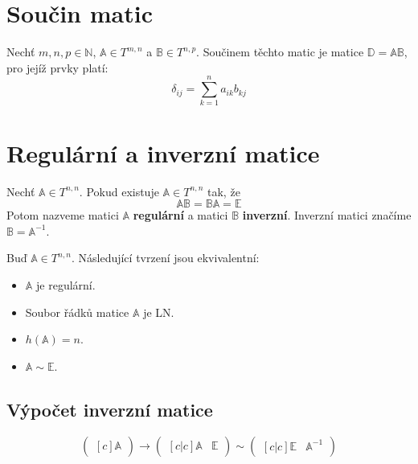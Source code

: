 \documentclass{szzclass}
\begin{document}
\section{Součin matic}
Nechť $m,n,p\in \mathbb{N}$, $\mathbb{A}\in T^{m,n}$ a $\mathbb{B}\in T^{n,p}$. Součinem těchto matic je matice $\mathbb{D}=\mathbb{A}\mathbb{B}$, pro jejíž prvky platí:
$$
\delta_{ij}=\sum_{k=1}^{n}{a_{ik} b_{kj}}
$$

\section{Regulární a inverzní matice}
\begin{definition}
Nechť $\mathbb{A}\in T^{n,n}$. Pokud existuje $\mathbb{A}\in T^{n,n}$ tak, že 
$$
\mathbb{A}\mathbb{B}=\mathbb{B}\mathbb{A}=\mathbb{E}
$$
Potom nazveme matici $\mathbb{A}$ \textbf{regulární} a matici $\mathbb{B}$ \textbf{inverzní}. Inverzní matici značíme $\mathbb{B}=\mathbb{A}^{-1}$.
\end{definition}

\begin{theorem}
Buď $\mathbb{A}\in T^{n,n}$. Následující tvrzení jsou ekvivalentní:
\begin{itemize}
\item $\mathbb{A}$ je regulární.
\item Soubor řádků matice $\mathbb{A}$ je LN.
\item $h(\mathbb{A}) = n$.
\item $\mathbb{A} \sim \mathbb{E}$.
\end{itemize}
\end{theorem}

\subsection{Výpočet inverzní matice}
\textit{}
\begin{equation}
\begin{pmatrix}[c]
\mathbb{A}
\end{pmatrix} \rightarrow
\begin{pmatrix}[c|c]
\mathbb{A} & \mathbb{E}
\end{pmatrix} \sim
\begin{pmatrix}[c|c]
\mathbb{E} & \mathbb{A}^{-1}
\end{pmatrix}
\end{equation}
\end{document}
